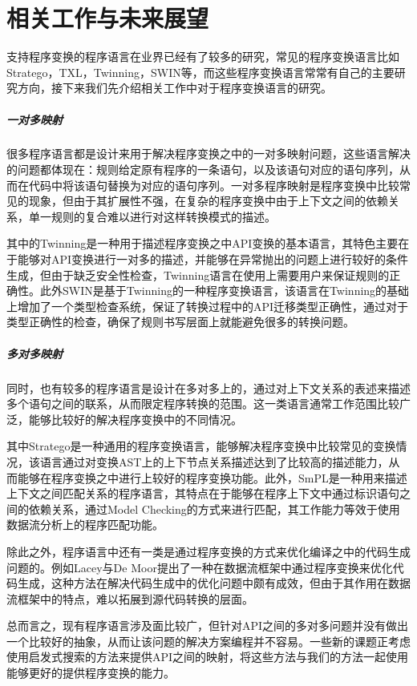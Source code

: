
\chapter{相关工作与未来展望}

支持程序变换的程序语言在业界已经有了较多的研究，常见的程序变换语言比如Stratego\cite{stratego}，TXL\cite{txl}，Twinning\cite{twinning}，SWIN\cite{swin-tr}等，而这些程序变换语言常常有自己的主要研究方向，接下来我们先介绍相关工作中对于程序变换语言的研究。

\paragraph{一对多映射} 很多程序语言都是设计来用于解决程序变换之中的一对多映射问题\cite{twinning,swin,oopsla05,refaster,reba,catchup}，这些语言解决的问题都体现在：规则给定原有程序的一条语句，以及该语句对应的语句序列，从而在代码中将该语句替换为对应的语句序列。一对多程序映射是程序变换中比较常见的现象，但由于其扩展性不强，在复杂的程序变换中由于上下文之间的依赖关系，单一规则的复合难以进行对这样转换模式的描述。

其中的Twinning\cite{twinning}是一种用于描述程序变换之中API变换的基本语言，其特色主要在于能够对API变换进行一对多的描述，并能够在异常抛出的问题上进行较好的条件生成，但由于缺乏安全性检查，Twinning语言在使用上需要用户来保证规则的正确性。此外SWIN\cite{swin}是基于Twinning的一种程序变换语言，该语言在Twinning的基础上增加了一个类型检查系统，保证了转换过程中的API迁移类型正确性，通过对于类型正确性的检查，确保了规则书写层面上就能避免很多的转换问题。

\paragraph{多对多映射}
同时，也有较多的程序语言是设计在多对多上的，通过对上下文关系的表述来描述多个语句之间的联系，从而限定程序转换的范围。这一类语言通常工作范围比较广泛，能够比较好的解决程序变换中的不同情况。

其中Stratego\cite{stratego}是一种通用的程序变换语言，能够解决程序变换中比较常见的变换情况，该语言通过对变换AST上的上下节点关系描述达到了比较高的描述能力，从而能够在程序变换之中进行上较好的程序变换功能。此外，SmPL\cite{spatch}是一种用来描述上下文之间匹配关系的程序语言，其特点在于能够在程序上下文中通过标识语句之间的依赖关系，通过Model Checking的方式来进行匹配，其工作能力等效于使用数据流分析上的程序匹配功能。

\medskip
除此之外，程序语言中还有一类是通过程序变换的方式来优化编译之中的代码生成问题的。例如Lacey与De Moor\cite{imperative}提出了一种在数据流框架中通过程序变换来优化代码生成，这种方法在解决代码生成中的优化问题中颇有成效，但由于其作用在数据流框架中的特点，难以拓展到源代码转换的层面。

总而言之，现有程序语言涉及面比较广，但针对API之间的多对多问题并没有做出一个比较好的抽象，从而让该问题的解决方案编程并不容易。一些新的课题正考虑使用启发式搜索的方法来提供API之间的映射\cite{catchup,semanticpatch}，将这些方法与我们的方法一起使用能够更好的提供程序变换的能力。